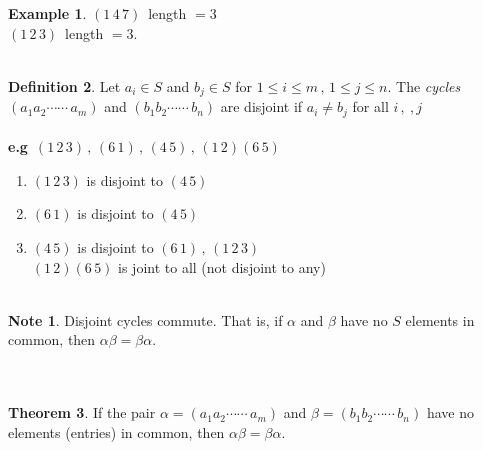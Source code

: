 \documentclass[11pt,a4paper]{article}
\theoremstyle{definition}
\newtheorem{thm}{Theorem}[subsection]
\newtheorem{defn}[thm]{Definition}
\newtheorem{exa}[thm]{Example}
\newtheorem*{note}{Note}
\begin{document}
\begin{exa}
$(1\,4\, 7)\, $ length $= 3$\\
$(1\,2\,3)\, $ length $=3$.\\\\
\end{exa}





\begin{defn}
Let $a_i\in S$ and $b_j\in S$ for $1\leq i\leq m\,, \, 1\leq j\leq n$. The \textit{cycles} $(a_1a_2\cdots\cdots\, a_m)$ and $(b_1b_2\cdots\cdots\, b_n)$ are disjoint if $a_i\neq b_j$ for all $i\, ,\ , j$\\\\




\textbf{e.g} $\, (1\, 2\, 3)\, , \, (6\, 1)\, , \, (4\, 5)\, , \, (1\,2)(6\,5)$
\begin{enumerate}
\item[$*$] $(1\, 2\,3)$ is disjoint to $(4\,5)$
\item[$*$] $(6\,1)$ is disjoint to $(4\, 5)$
\item[$*$] $(4\, 5)$ is disjoint to $(6\,1)\, , \, (1\, 2\, 3)$\\

$(1\,2)(6\,5)$ is joint to all (not disjoint to any)\\\\
\end{enumerate}
\end{defn}




\begin{note}
Disjoint cycles commute. That is, if $\alpha$ and $\beta$ have no $S$ elements in common, then $\alpha \beta = \beta \alpha$.\\\\\\
\end{note}



\begin{thm}
If the pair $\alpha = (a_1a_2\cdots\cdots\, a_m)$ and $\beta = (b_1b_2\cdots\cdots\, b_n)$ have no elements (entries) in common,  then $\alpha \beta = \beta \alpha$.\\
\end{thm}
\end{document}
